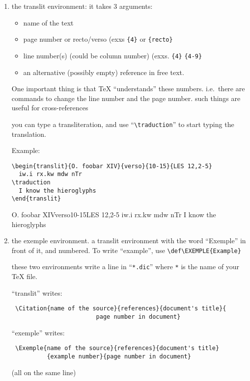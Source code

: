 \documentclass[final]{article}
\begin{document}
\begin{enumerate}
 \item the translit environment:
 it takes 3 arguments: 
\begin{itemize}
        \item name of the text
        \item page number or recto/verso (exxs \verb/{4}/ or \verb/{recto}/
        \item line number(s) (could be column number) (exxs.
\verb/{4}/ \verb/{4-9}/ 
        \item an alternative (possibly empty) reference in free text.
\end{itemize}

 One important thing is that TeX ``understands'' these numbers.
 i.e.\ there are commands to change the line number and the page 
 number. such things are useful for cross-references

 you can  type a transliteration, and use ``\verb/\traduction/'' to start
 typing the translation.

 Example:

\begin{verbatim}
\begin{translit}{O. foobar XIV}{verso}{10-15}{LES 12,2-5}
  iw.i rx.kw mdw nTr
\traduction
  I know the hieroglyphs
\end{translit}
\end{verbatim}
 \begin{translit}{O. foobar XIV}{verso}{10-15}{LES 12,2-5}
 iw.i rx.kw mdw nTr
 \traduction
 I know the hieroglyphs
 \end{translit}

 \item the exemple environment. \sloppy
 a translit environment with the word ``Exemple'' in front of 
 it, and numbered. To write ``example'',  use
 \verb/\def\EXEMPLE{Example}/

\fussy
 these two environments write a line in ``\verb/*.dic/'' where \verb/*/
 is the name of your TeX file.

 ``translit'' writes:
\begin{verbatim}
 \Citation{name of the source}{references}{document's title}{
                        page number in document}
\end{verbatim}

 ``exemple'' writes:
\begin{verbatim}
 \Exemple{name of the source}{references}{document's title}
          {example number}{page number in document}
\end{verbatim}
(all on the same line)


\end{enumerate}
\end{document}
